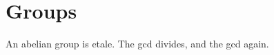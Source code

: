 \documentclass{article}
\begin{document}
\section{Groups}
An \gls{abelian} \gls{group} is \gls{etale}. The \gls{gcd} divides, and
the \gls{gcd} again.
\printglossaries
\end{document}
